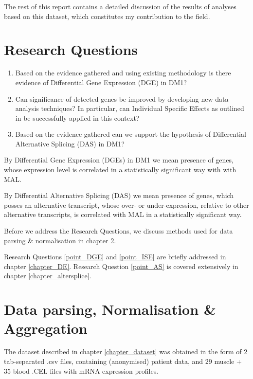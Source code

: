 The rest of this report contains a detailed discussion of the results of analyses based on this dataset, which constitutes my contribution to the field.

\section{Research Questions} \label{chapter_researchquestion}

\begin{enumerate}
\item \label{point_DGE} Based on the evidence gathered and using existing methodology is there evidence of Differential Gene Expression (DGE) in DM1?
\item \label{point_ISE} Can significance of detected genes be improved by developing new data analysis techniques? In particular, can Individual Specific Effects as outlined in \parencite{Kurkiewicz2017} be successfully applied in this context?
\item \label{point_AS} Based on the evidence gathered can we support the hypothesis of Differential Alternative Splicing (DAS) in DM1?
\end{enumerate}

By Differential Gene Expression (DGEs) in DM1 we mean presence of genes, whose expression level is correlated in a statistically significant way with with MAL.

By Differential Alternative Splicing (DAS) we mean presence of genes, which posses an alternative transcript, whose over- or under-expression, relative to other alternative transcripts, is correlated with MAL in a statistically significant way.

Before we address the Research Questions, we discuss methods used for data parsing \& normalisation in chapter \ref{chapter_parsing}.

Research Questions \ref{point_DGE} and \ref{point_ISE} are briefly addressed in chapter \ref{chapter_DE}. Research Question \ref{point_AS} is covered extensively in chapter \ref{chapter_altersplice}.

\section{Data parsing, Normalisation \& Aggregation} \label{chapter_parsing}

The dataset described in chapter \ref{chapter_dataset} was obtained in the form of 2 tab-separated .csv files, containing (anonymised) patient data, and 29 muscle + 35 blood .CEL files with mRNA expression profiles.

